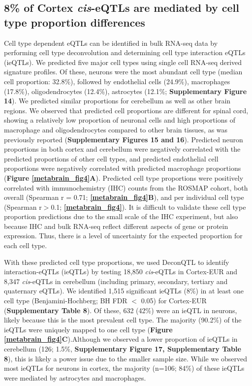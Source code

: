 \subsection{8\% of Cortex \textit{cis}-eQTLs are mediated by cell type proportion differences  }
Cell type dependent eQTLs can be identified in bulk RNA-seq data by performing cell type deconvolution and determining cell type interaction eQTLs (ieQTLs)\cite{donovanCellularDeconvolutionGTEx2020,glastonburyCellTypeHeterogeneityAdipose2019,raulaguirregamboaDeconvolutionBulkBlood2020}. We predicted five major cell types using single cell RNA-seq derived signature profiles\cite{zhengyuCellMapCharacterizingType}. Of these, neurons were the most abundant cell type (median cell proportion: 32.8\%), followed by endothelial cells (24.9\%), macrophages (17.8\%), oligodendrocytes (12.4\%), astrocytes (12.1\%; \textbf{Supplementary Figure 14}). We predicted similar proportions for cerebellum as well as other brain regions. We observed that predicted cell proportions are different for spinal cord, showing a relatively low proportion of neuronal cells and high proportions of macrophage and oligodendrocytes compared to other brain tissues, as was previously reported\cite{bahneyCellularCompositionGliaNeuron2018} (\textbf{Supplementary Figures 15 and 16}). Predicted neuron proportions in both cortex and cerebellum were negatively correlated with the predicted proportions of other cell types, and predicted endothelial cell proportions were negatively correlated with predicted macrophage proportions (\textbf{Figure \ref{metabrain_fig4}A}). Predicted cell type proportions were positively correlated with immunochemistry (IHC) counts from the ROSMAP cohort\cite{patrickDeconvolvingContributionsCelltype2020}, both overall (Spearman r = 0.71; \textbf{\ref{metabrain_fig4}B}), and per individual cell type (Spearman r$>$0.1; \textbf{\ref{metabrain_fig4}}).  It is difficult to validate these cell type proportion predictions due to the small scale of the IHC experiment, but also because IHC and bulk RNA-seq reflect different aspects of gene or protein expression. Thus, there is a level of uncertainty for the expected proportion for each cell type\cite{herculano-houzelHumanBrainNumbers2009,vonbartheldSearchTrueNumbers2016}. 

With these predicted cell type proportions, we used DeconQTL\cite{raulaguirregamboaDeconvolutionBulkBlood2020} to identify interaction-eQTLs (ieQTLs) by testing 18,850 \textit{cis}-eQTLs in Cortex-EUR and 8,347 \textit{cis}-eQTLs in cerebellum (including primary, secondary, tertiary and quaternary eQTLs). We identified 1,515 significant ieQTLs (8\%) in at least one cell type (Benjamini-Hochberg; BH FDR $<$ 0.05) for Cortex-EUR (\textbf{Supplementary Table 8}). Of these, 632 (42\%) were an ieQTL in neurons, likely because this is the most prevalent cell type. The majority (90.2\%) of the ieQTLs were uniquely mapped to one cell type (\textbf{Figure \ref{metabrain_fig4}C}).Although we observed a lower proportion of ieQTLs in cerebellum (126; 1.5\%, \textbf{Supplementary Figure 17, Supplementary Table 8}), this is likely a power issue due to the smaller sample size. While we observed most ieQTLs for neurons in cortex, the majority (n=106; 84\%) of these ieQTLs were mediated by astrocytes and macrophages.  


